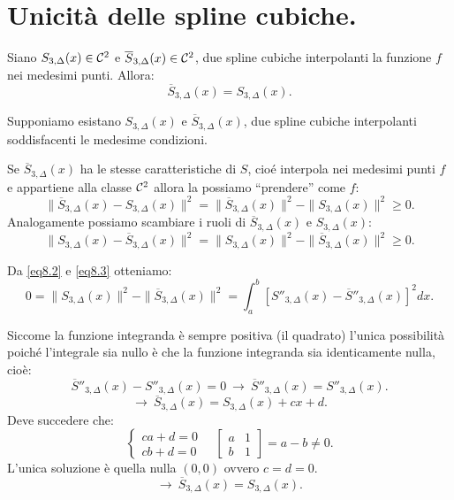 \section{Unicità delle spline cubiche.}
\begin{prop}
Siano $S_{3,\Delta}(x) \in \mathcal{C}^2$ e $\overline{S}_{3,\Delta}(x) \in \mathcal{C}^2$, 
due spline cubiche interpolanti la funzione $f$ nei medesimi punti. Allora:
\[
\overline{S}_{3,\Delta}(x) = S_{3,\Delta}(x).
\]
\end{prop}
\begin{dimo}
Supponiamo  esistano $S_{3,\Delta}(x)$ e $\overline{S}_{3,\Delta}(x)$, due spline
cubiche interpolanti soddisfacenti le medesime condizioni.

Se $\overline{S}_{3,\Delta}(x)$ ha le stesse caratteristiche di $S$, cioé
interpola nei medesimi punti $f$ e appartiene alla classe $\mathcal{C}^2$ allora la 
possiamo ``prendere'' come $f$:
\begin{equation}\label{eq8.2}
\|\overline{S}_{3,\Delta}(x) - S_{3,\Delta}(x)\|^2
=\| \overline{S}_{3,\Delta}(x)\|^2 - \|S_{3,\Delta}(x)\|^2 \geq 0.
\end{equation}
Analogamente possiamo scambiare i ruoli di $\overline{S}_{3,\Delta}(x)$ e 
$S_{3,\Delta}(x)$:
\begin{equation}\label{eq8.3}
\|S_{3,\Delta}(x) - \overline{S}_{3,\Delta}(x)\|^2
=\|S_{3,\Delta}(x)\|^2- \|\overline{S}_{3,\Delta}(x)\|^2   \geq 0.
\end{equation}

Da \ref{eq8.2} e \ref{eq8.3} otteniamo:
\[
0 = \|S_{3,\Delta}(x)\|^2- \|\overline{S}_{3,\Delta}(x)\|^2 = 
\int_a^b[S''_{3,\Delta}(x)- \overline{S}''_{3,\Delta}(x)]^2dx.
\]

Siccome la funzione integranda è sempre positiva (il quadrato) l'unica
possibilità poiché l'integrale sia nullo è che la funzione integranda sia
identicamente nulla, cioè:
\[
\overline{S}''_{3,\Delta}(x) - S''_{3,\Delta}(x) = 0 \ \longrightarrow \
\overline{S}''_{3,\Delta}(x) = S''_{3,\Delta}(x).
\]
\[
\longrightarrow \ \overline{S}_{3,\Delta}(x) = S_{3,\Delta}(x) + cx +d.
\]
Deve succedere che:
\[
\left\{\begin{array}{r}ca+d = 0 \\ cb+d = 0\end{array} \right.
\quad \left[\begin{array}{cc}a & 1 \\ b&1\end{array} \right] = a-b \neq 0. 
\]
L'unica soluzione è quella nulla $(0,0)$ ovvero $c = d = 0$.
\[\longrightarrow \ \overline{S}_{3,\Delta}(x) = S_{3,\Delta}(x).\]
\end{dimo}


